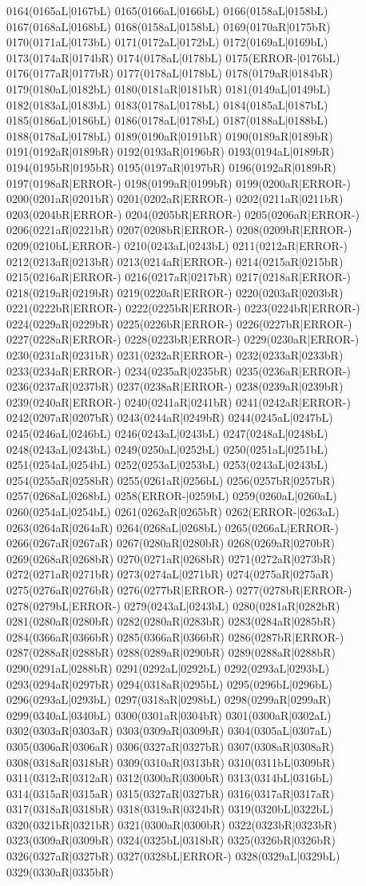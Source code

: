 0164(0165aL|0167bL) 0165(0166aL|0166bL) 0166(0158aL|0158bL) 0167(0168aL|0168bL) 0168(0158aL|0158bL) 0169(0170aR|0175bR) 0170(0171aL|0173bL) 0171(0172aL|0172bL) 0172(0169aL|0169bL) 0173(0174aR|0174bR) 0174(0178aL|0178bL) 0175(ERROR-|0176bL) 0176(0177aR|0177bR) 0177(0178aL|0178bL) 0178(0179aR|0184bR) 0179(0180aL|0182bL) 0180(0181aR|0181bR) 0181(0149aL|0149bL) 0182(0183aL|0183bL) 0183(0178aL|0178bL) 0184(0185aL|0187bL) 0185(0186aL|0186bL) 0186(0178aL|0178bL) 0187(0188aL|0188bL) 0188(0178aL|0178bL) 0189(0190aR|0191bR) 0190(0189aR|0189bR) 0191(0192aR|0189bR) 0192(0193aR|0196bR) 0193(0194aL|0189bR) 0194(0195bR|0195bR) 0195(0197aR|0197bR) 0196(0192aR|0189bR) 0197(0198aR|ERROR-) 0198(0199aR|0199bR) 0199(0200aR|ERROR-) 0200(0201aR|0201bR) 0201(0202aR|ERROR-) 0202(0211aR|0211bR) 0203(0204bR|ERROR-) 0204(0205bR|ERROR-) 0205(0206aR|ERROR-) 0206(0221aR|0221bR) 0207(0208bR|ERROR-) 0208(0209bR|ERROR-) 0209(0210bL|ERROR-) 0210(0243aL|0243bL) 0211(0212aR|ERROR-) 0212(0213aR|0213bR) 0213(0214aR|ERROR-) 0214(0215aR|0215bR) 0215(0216aR|ERROR-) 0216(0217aR|0217bR) 0217(0218aR|ERROR-) 0218(0219aR|0219bR) 0219(0220aR|ERROR-) 0220(0203aR|0203bR) 0221(0222bR|ERROR-) 0222(0225bR|ERROR-) 0223(0224bR|ERROR-) 0224(0229aR|0229bR) 0225(0226bR|ERROR-) 0226(0227bR|ERROR-) 0227(0228aR|ERROR-) 0228(0223bR|ERROR-) 0229(0230aR|ERROR-) 0230(0231aR|0231bR) 0231(0232aR|ERROR-) 0232(0233aR|0233bR) 0233(0234aR|ERROR-) 0234(0235aR|0235bR) 0235(0236aR|ERROR-) 0236(0237aR|0237bR) 0237(0238aR|ERROR-) 0238(0239aR|0239bR) 0239(0240aR|ERROR-) 0240(0241aR|0241bR) 0241(0242aR|ERROR-) 0242(0207aR|0207bR) 0243(0244aR|0249bR) 0244(0245aL|0247bL) 0245(0246aL|0246bL) 0246(0243aL|0243bL) 0247(0248aL|0248bL) 0248(0243aL|0243bL) 0249(0250aL|0252bL) 0250(0251aL|0251bL) 0251(0254aL|0254bL) 0252(0253aL|0253bL) 0253(0243aL|0243bL) 0254(0255aR|0258bR) 0255(0261aR|0256bL) 0256(0257bR|0257bR) 0257(0268aL|0268bL) 0258(ERROR-|0259bL) 0259(0260aL|0260aL) 0260(0254aL|0254bL) 0261(0262aR|0265bR) 0262(ERROR-|0263aL) 0263(0264aR|0264aR) 0264(0268aL|0268bL) 0265(0266aL|ERROR-) 0266(0267aR|0267aR) 0267(0280aR|0280bR) 0268(0269aR|0270bR) 0269(0268aR|0268bR) 0270(0271aR|0268bR) 0271(0272aR|0273bR) 0272(0271aR|0271bR) 0273(0274aL|0271bR) 0274(0275aR|0275aR) 0275(0276aR|0276bR) 0276(0277bR|ERROR-) 0277(0278bR|ERROR-) 0278(0279bL|ERROR-) 0279(0243aL|0243bL) 0280(0281aR|0282bR) 0281(0280aR|0280bR) 0282(0280aR|0283bR) 0283(0284aR|0285bR) 0284(0366aR|0366bR) 0285(0366aR|0366bR) 0286(0287bR|ERROR-) 0287(0288aR|0288bR) 0288(0289aR|0290bR) 0289(0288aR|0288bR) 0290(0291aL|0288bR) 0291(0292aL|0292bL) 0292(0293aL|0293bL) 0293(0294aR|0297bR) 0294(0318aR|0295bL) 0295(0296bL|0296bL) 0296(0293aL|0293bL) 0297(0318aR|0298bL) 0298(0299aR|0299aR) 0299(0340aL|0340bL) 0300(0301aR|0304bR) 0301(0300aR|0302aL) 0302(0303aR|0303aR) 0303(0309aR|0309bR) 0304(0305aL|0307aL) 0305(0306aR|0306aR) 0306(0327aR|0327bR) 0307(0308aR|0308aR) 0308(0318aR|0318bR) 0309(0310aR|0313bR) 0310(0311bL|0309bR) 0311(0312aR|0312aR) 0312(0300aR|0300bR) 0313(0314bL|0316bL) 0314(0315aR|0315aR) 0315(0327aR|0327bR) 0316(0317aR|0317aR) 0317(0318aR|0318bR) 0318(0319aR|0324bR) 0319(0320bL|0322bL) 0320(0321bR|0321bR) 0321(0300aR|0300bR) 0322(0323bR|0323bR) 0323(0309aR|0309bR) 0324(0325bL|0318bR) 0325(0326bR|0326bR) 0326(0327aR|0327bR) 0327(0328bL|ERROR-) 0328(0329aL|0329bL) 0329(0330aR|0335bR) 
